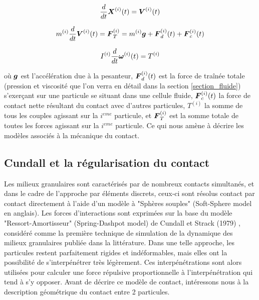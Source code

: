 \begin{equation} \label{eq_solide1}
\frac{d}{dt} \boldsymbol{X}^{(i)}(t) = \boldsymbol{V}^{(i)}(t)
\end{equation}

\begin{equation} \label{eq_solide2}
m^{(i)} \frac{d}{dt} \boldsymbol{V}^{(i)}(t) = \boldsymbol{F}_T^{(i)} = m^{(i)} \boldsymbol{g} + \boldsymbol{F}_d^{(i)}(t) + \boldsymbol{F}_c^{(i)}(t)
\end{equation}

\begin{equation} \label{eq_solide3}
I^{(i)} \frac{d}{dt}\boldsymbol{\omega}^{(i)}(t) = T^{(i)}
\end{equation}

où $\boldsymbol{g}$ est l'accélération due à la pesanteur, $\boldsymbol{F}_d^{(i)}(t)$ est la force de traînée totale (pression et viscosité que l'on verra en détail dans la section \ref{section_fluide}) s'exerçant sur une particule se situant dans une cellule fluide, $\boldsymbol{F}_c^{(i)}(t)$ la force de contact nette résultant du contact avec d'autres particules, $T^{(i)}$ la somme de tous les couples agissant sur la $i^{eme}$  particule, et $\boldsymbol{F}_T^{(i)}$ est la somme totale de toutes les forces agissant sur la $i^{eme}$ particule. Ce qui nous amène à décrire les modèles associés à la mécanique du contact.

\subsection{Cundall et la régularisation du contact}

Les milieux granulaires sont caractérisés par de nombreux contacts simultanés, et dans le cadre de l'approche par éléments discrets, ceux-ci sont résolus contact par contact directement à l'aide d'un modèle à "Sphères souples" (Soft-Sphere model en anglais). Les forces d'interactions sont exprimées sur la base du modèle "Ressort-Amortisseur" (Spring-Dashpot model) de Cundall et Strack (1979) \cite{cundall1979discrete}, considéré comme la première technique de simulation de la dynamique des milieux granulaires publiée dans la littérature. Dans une telle approche, les particules restent parfaitement rigides et indéformables, mais elles ont la possibilité de s’interpénétrer très légèrement. Ces interpénétrations sont alors utilisées pour calculer une force répulsive proportionnelle à l'interpénétration qui tend à s'y opposer. Avant de décrire ce modèle de contact, intéressons nous à la description géométrique du contact entre 2 particules.

